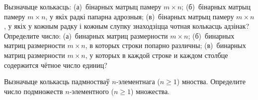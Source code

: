 \begin{problemList}
\problemItemSimple
{Вызначыце колькасць: (а)~бінарных матрыц памеру $m \times n$; (б)~бінарных матрыц памеру $m \times n$, у якіх радкі папарна адрозныя; (в)~бінарных матрыц памеру $m \times n$, у якіх у кожным радку і кожным слупку знаходзіцца чотная колькасць адзінак?}
{Определите число: (а)~бинарных матриц размерности $m \times n$; (б)~бинарных матриц размерности $m \times n$, в которых строки попарно различны; (в)~бинарных матриц размерности $m \times n$, у которых в каждой строке и каждом столбце содержится чётное число единиц?}

\problemItemSimple
{Вызначыце колькасць падмностваў $n$-элементнага ($n \ge 1$) мноства.}
{Определите число подмножеств $n$-элементного ($n \ge 1$) множества.}

\end{problemList}

